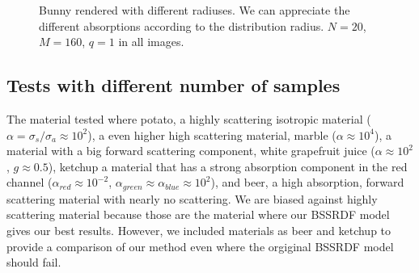 \begin{figure}[h]
\centering
{}
\caption{Bunny rendered with different radiuses. We can appreciate the different absorptions according to the distribution radius. $N = 20$, $M = 160$, $q = 1$ in all images.}
\label{fig:bunnytr}
\end{figure}

\subsection{Tests with different number of samples}

The material tested where potato, a highly scattering isotropic material ($\alpha = \sigma_s / \sigma_a \approx 10^2$), a even higher high scattering material, marble ($\alpha \approx 10^4$), a material with a big forward scattering component, white grapefruit juice ($\alpha \approx 10^2$, $g \approx 0.5$), ketchup a material that has a strong absorption component in the red channel ($\alpha_{red} \approx 10^{-2}$, $\alpha_{green} \approx \alpha_{blue} \approx 10^2$), and beer, a high absorption, forward scattering material with nearly no scattering. We are biased against highly scattering material because those are the material where our BSSRDF model gives our best results. However, we included materials as beer and ketchup to provide a comparison of our method even where the orgiginal BSSRDF model should fail.

